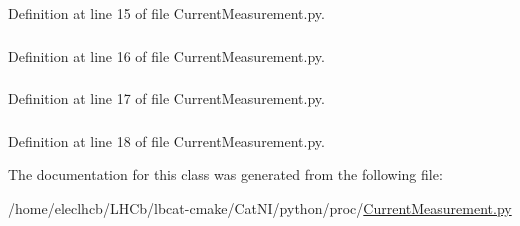 Definition at line 15 of file CurrentMeasurement.py.\hypertarget{classCurrentMeasurement_1_1CurrentMeasurement_ad88b00c17c89b2c02193c926e1198ca7}{
\subsubsection[{s2}]{}}
\label{classCurrentMeasurement_1_1CurrentMeasurement_ad88b00c17c89b2c02193c926e1198ca7}


Definition at line 16 of file CurrentMeasurement.py.\hypertarget{classCurrentMeasurement_1_1CurrentMeasurement_aae05b51df6c8e3cee2133eca4aee1f86}{
\subsubsection[{s3}]{}}
\label{classCurrentMeasurement_1_1CurrentMeasurement_aae05b51df6c8e3cee2133eca4aee1f86}


Definition at line 17 of file CurrentMeasurement.py.\hypertarget{classCurrentMeasurement_1_1CurrentMeasurement_af84388267bc65ccd644639685d6e858c}{
\subsubsection[{s4}]{}}
\label{classCurrentMeasurement_1_1CurrentMeasurement_af84388267bc65ccd644639685d6e858c}


Definition at line 18 of file CurrentMeasurement.py.

The documentation for this class was generated from the following file:\begin{DoxyCompactItemize}
\item 
/home/eleclhcb/LHCb/lbcat-\/cmake/CatNI/python/proc/\hyperlink{CurrentMeasurement_8py}{CurrentMeasurement.py}\end{DoxyCompactItemize}

